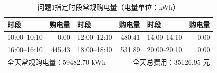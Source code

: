 \begin{table}[H]\centering\small
\caption{问题1指定时段常规购电量（电量单位：kWh）}
\label{tab:q1_purchase}
\begin{tabular}{lrlrlr}\toprule
时段 & 购电量 & 时段 & 购电量 & 时段 & 购电量 \\\midrule
10:00--10:10 & 0.00 & 12:00--12:10 & 480.41 & 14:00--14:10 & 0.00 \\
16:00--16:10 & 445.43 & 18:00--18:10 & 531.89 & 20:00--20:10 & 0.00 \\
\midrule
\multicolumn{3}{l}{全天常规购电量：59482.70 kWh} & \multicolumn{3}{r}{全天总费用：35126.95 元}\\
\bottomrule\end{tabular}\end{table}
